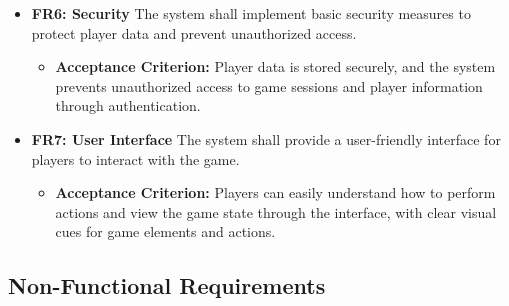 \documentclass{scrartcl}
\begin{document}
\begin{itemize}
  \item \textbf{FR6: Security} \newline
  The system shall implement basic security measures to protect player data and prevent unauthorized access.
  \begin{itemize}
    \item \textbf{Acceptance Criterion:} Player data is stored securely, and the system prevents unauthorized access to game sessions and player information through authentication.
  \end{itemize}

  \item \textbf{FR7: User Interface} \newline
  The system shall provide a user-friendly interface for players to interact with the game.
  \begin{itemize}
    \item \textbf{Acceptance Criterion:} Players can easily understand how to perform actions and view the game state through the interface, with clear visual cues for game elements and actions.
  \end{itemize}

\end{itemize}

\subsection{Non-Functional Requirements}
\label{non-functional-requirements}
\end{document}
